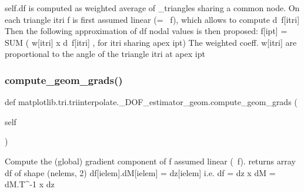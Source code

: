 \begin{DoxyVerb}self.df is computed as weighted average of _triangles sharing a common
node. On each triangle itri f is first assumed linear (= ~f), which
allows to compute d~f[itri]
Then the following approximation of df nodal values is then proposed:
    f[ipt] = SUM ( w[itri] x d~f[itri] , for itri sharing apex ipt)
The weighted coeff. w[itri] are proportional to the angle of the
triangle itri at apex ipt
\end{DoxyVerb}
 \mbox{\label{classmatplotlib_1_1tri_1_1triinterpolate_1_1__DOF__estimator__geom_a3b459fb71ceda04299deddac8f6283c4}} 
\subsubsection{\texorpdfstring{compute\+\_\+geom\+\_\+grads()}{compute\_geom\_grads()}}
{\footnotesize\ttfamily def matplotlib.\+tri.\+triinterpolate.\+\_\+\+D\+O\+F\+\_\+estimator\+\_\+geom.\+compute\+\_\+geom\+\_\+grads (\begin{DoxyParamCaption}\item[{}]{self }\end{DoxyParamCaption})}

\begin{DoxyVerb}Compute the (global) gradient component of f assumed linear (~f).
returns array df of shape (nelems, 2)
df[ielem].dM[ielem] = dz[ielem] i.e. df = dz x dM = dM.T^-1 x dz
\end{DoxyVerb}
 \mbox{\label{classmatplotlib_1_1tri_1_1triinterpolate_1_1__DOF__estimator__geom_a16ec5b0c62ead2e5c291a8285ebdbf64}} 
